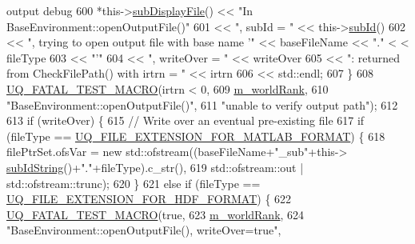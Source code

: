 \begin{DoxyCode}
{       output debug}
600         *this->\hyperlink{class_q_u_e_s_o_1_1_base_environment_a8a0064746ae8dddfece4229b9ad374d6}{subDisplayFile}() << \textcolor{stringliteral}{"In BaseEnvironment::openOutputFile()"}
601                                 << \textcolor{stringliteral}{", subId = "}     << this->\hyperlink{class_q_u_e_s_o_1_1_base_environment_a6ae3174897a9b3a4c85fa18da5d4c16f}{subId}()
602                                 << \textcolor{stringliteral}{", trying to open output file with base name '"} << baseFileName << \textcolor{stringliteral}{"."} <
      < fileType
603                                 << \textcolor{stringliteral}{"'"}
604                                 << \textcolor{stringliteral}{", writeOver = "} << writeOver
605                                 << \textcolor{stringliteral}{": returned from CheckFilePath() with irtrn = "} << irtrn
606                                 << std::endl;
607       \}
608       \hyperlink{_defines_8h_a56d63d18d0a6d45757de47fcc06f574d}{UQ\_FATAL\_TEST\_MACRO}(irtrn < 0,
609                           \hyperlink{class_q_u_e_s_o_1_1_base_environment_a464cab923ada0e14c6e3a4000c2ea385}{m\_worldRank},
610                           \textcolor{stringliteral}{"BaseEnvironment::openOutputFile()"},
611                           \textcolor{stringliteral}{"unable to verify output path"});
612 
613       \textcolor{keywordflow}{if} (writeOver) \{
615         \textcolor{comment}{// Write over an eventual pre-existing file}
617 \textcolor{comment}{}        \textcolor{keywordflow}{if} (fileType == \hyperlink{_defines_8h_ac440026eff7deb1c1eed1eea0e8e36ba}{UQ\_FILE\_EXTENSION\_FOR\_MATLAB\_FORMAT}) \{
618           filePtrSet.ofsVar = \textcolor{keyword}{new} std::ofstream((baseFileName+\textcolor{stringliteral}{"\_sub"}+this->
      \hyperlink{class_q_u_e_s_o_1_1_base_environment_a73f7849acdd5d5ba15a3094fe18f258f}{subIdString}()+\textcolor{stringliteral}{"."}+fileType).c\_str(), 
619                                                 std::ofstream::out | std::ofstream::trunc);
620         \}
621         \textcolor{keywordflow}{else} \textcolor{keywordflow}{if} (fileType == \hyperlink{_defines_8h_a4ebcc075277d031eb97c90b9a45f4493}{UQ\_FILE\_EXTENSION\_FOR\_HDF\_FORMAT}) \{
622           \hyperlink{_defines_8h_a56d63d18d0a6d45757de47fcc06f574d}{UQ\_FATAL\_TEST\_MACRO}(\textcolor{keyword}{true},
623                               \hyperlink{class_q_u_e_s_o_1_1_base_environment_a464cab923ada0e14c6e3a4000c2ea385}{m\_worldRank},
624                               \textcolor{stringliteral}{"BaseEnvironment::openOutputFile(), writeOver=true"},

\end{DoxyCode}
